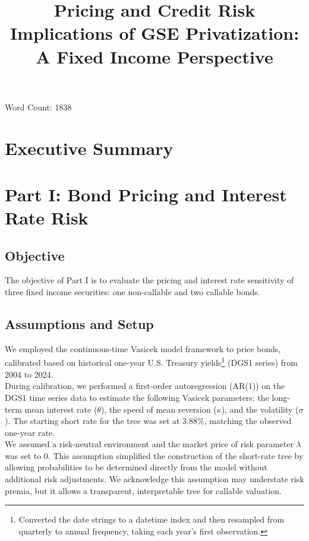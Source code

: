 \documentclass{article}
\title{Pricing and Credit Risk Implications of GSE Privatization: A Fixed Income Perspective}
\author{}
\date{}
\begin{document}
\maketitle

\tableofcontents
\vspace{1em}
\noindent Word Count: 1838

\newpage

\section{Executive Summary}


\section{Part I: Bond Pricing and Interest Rate Risk}
\subsection{Objective}
The objective of Part I is to evaluate the pricing and interest rate sensitivity of three fixed income securities: one non-callable and two callable bonds.

\subsection{Assumptions and Setup}

We employed the continuous-time Vasicek model framework to price bonds, calibrated based on historical one-year U.S. Treasury yields\footnote{Converted the date strings to a datetime index and then resampled from quarterly to annual frequency, taking each year’s first observation.} (DGS1 series) from 2004 to 2024. \\

During calibration, we performed a first-order autoregression (AR(1)) on the DGS1 time series data to estimate the following Vasicek parameters: the long-term mean interest rate ($\theta$), the speed of mean reversion ($\kappa$), and the volatility ($\sigma$). The starting short rate for the tree was set at 3.88\%, matching the observed one-year rate. \\

We assumed a risk-neutral environment and the market price of risk parameter $\lambda$ was set to 0. This assumption simplified the construction of the short-rate tree by allowing probabilities to be determined directly from the model without additional risk adjustments. We acknowledge this assumption may understate risk premia, but it allows a transparent, interpretable tree for callable valuation. \\
\end{document}
